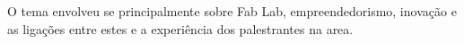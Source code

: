 

\myemptypage{}

O tema envolveu se principalmente sobre Fab Lab, empreendedorismo, 
inovação e as ligações entre estes e a experiência dos palestrantes na area.




